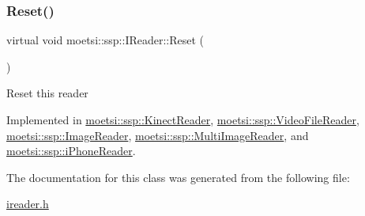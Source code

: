 \subsubsection{\texorpdfstring{Reset()}{Reset()}}
{\footnotesize\ttfamily virtual void moetsi\+::ssp\+::\+I\+Reader\+::\+Reset (\begin{DoxyParamCaption}{ }\end{DoxyParamCaption})\hspace{0.3cm}{\ttfamily [pure virtual]}}

Reset this reader 

Implemented in \hyperlink{classmoetsi_1_1ssp_1_1KinectReader_a0ad8f7b57ef04554e41a66db797c000e}{moetsi\+::ssp\+::\+Kinect\+Reader}, \hyperlink{classmoetsi_1_1ssp_1_1VideoFileReader_ac646d10b57d4e3b3ff4d1c83a47e8c3d}{moetsi\+::ssp\+::\+Video\+File\+Reader}, \hyperlink{classmoetsi_1_1ssp_1_1ImageReader_ae9ffc89ceed365c96b8d50e46ee8dc20}{moetsi\+::ssp\+::\+Image\+Reader}, \hyperlink{classmoetsi_1_1ssp_1_1MultiImageReader_a3a60b57e1db97cb170435dd7f0d4c66d}{moetsi\+::ssp\+::\+Multi\+Image\+Reader}, and \hyperlink{classmoetsi_1_1ssp_1_1iPhoneReader_a3d78eacce7d71483da93efde29f47241}{moetsi\+::ssp\+::i\+Phone\+Reader}.



The documentation for this class was generated from the following file\+:\begin{DoxyCompactItemize}
\item 
\hyperlink{ireader_8h}{ireader.\+h}\end{DoxyCompactItemize}
